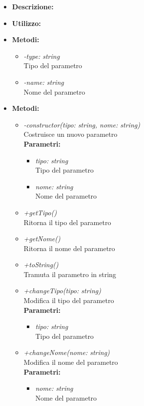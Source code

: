 \begin{itemize}
	\item \textbf{Descrizione:}\\
	
	\item \textbf{Utilizzo:}\\
	
	\item \textbf{Metodi:}
		\begin{itemize}
			\item \emph{-type: string}\\
    		Tipo del parametro
    		\item \emph{-name: string}\\
    		Nome del parametro
		\end{itemize}
	\item \textbf{Metodi:}
		\begin{itemize}
			\item \emph{-constructor(tipo: string, nome: string)}\\
    		Costruisce un nuovo parametro\\
    		\textbf{Parametri:}
    		\begin{itemize}
    			\item \emph{tipo: string}\\
    			Tipo del parametro
    			\item \emph{nome: string}\\
    			Nome del parametro
    		\end{itemize}
    		\item \emph{+getTipo()}\\
    		Ritorna il tipo del parametro
    		\item \emph{+getNome()}\\
    		Ritorna il nome del parametro
    		\item \emph{+toString()}\\
    		Tramuta il parametro in string
    		\item \emph{+changeTipo(tipo: string)}\\
    		Modifica il tipo del parametro\\
    		\textbf{Parametri:}
    		\begin{itemize}
    			\item \emph{tipo: string}\\
    			Tipo del parametro
    		\end{itemize}
    		\item \emph{+changeNome(nome: string)}\\
    		Modifica il nome del parametro\\
    		\textbf{Parametri:}
    		\begin{itemize}
    			\item \emph{nome: string}\\
    			Nome del parametro
    		\end{itemize}
    	\end{itemize}
\end{itemize}
